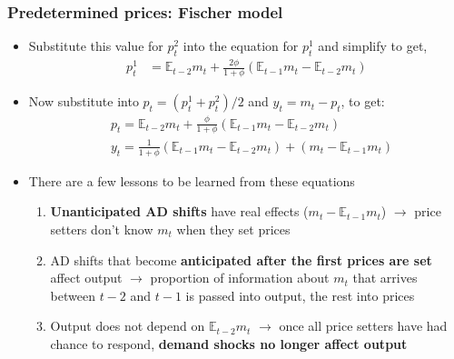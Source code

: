 \documentclass[10pt, xcolor=x11names, table]{beamer}
\begin{document}
\begin{frame}
\frametitle{Predetermined prices: Fischer model}
\begin{itemize}
\item Substitute this value for $p_{t}^{2}$ into the equation for $p_{t}^{1}$ and simplify to get,
\begin{align*}
p_{t}^{1} &= \mathbb{E}_{t-2}m_{t} + \frac{2\phi}{1+\phi}\left(\mathbb{E}_{t-1}m_{t} - \mathbb{E}_{t-2}m_{t}\right)
\end{align*}
\item Now substitute into $\textstyle p_{t} = (p_{t}^{1} + p_{t}^{2})/2$ and $y_{t} = m_{t} - p_{t}$, to get:
\begin{align*}
&p_{t} = \mathbb{E}_{t-2}m_{t} + \frac{\phi}{1+\phi}\left(\mathbb{E}_{t-1}m_{t} - \mathbb{E}_{t-2}m_{t}\right) \\
&y_{t} = \frac{1}{1+\phi}\left(\mathbb{E}_{t-1}m_{t} - \mathbb{E}_{t-2}m_{t}\right) + (m_{t} - \mathbb{E}_{t-1}m_{t})
\end{align*}
\item There are a few lessons to be learned from these equations
\begin{enumerate}
  \item \textbf{Unanticipated AD shifts} have real effects ($m_{t} - \mathbb{E}_{t-1}m_{t}$) $\rightarrow$ price setters don't know $m_{t}$ when they set prices
  \item AD shifts that become \textbf{anticipated after the first prices are set} affect output $\rightarrow$ proportion of information about $m_{t}$ that arrives between $t-2$ and $t-1$ is passed into output, the rest into prices
  \item Output does not depend on $\mathbb{E}_{t-2}m_{t}$ $\rightarrow$ once all price setters have had chance to respond, \textbf{demand shocks no longer affect output}
\end{enumerate}
\end{itemize}
\end{frame}
\end{document}
